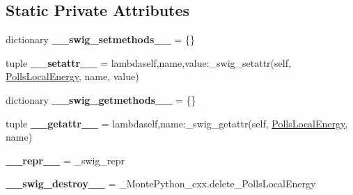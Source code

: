 \subsection*{Static Private Attributes}
\begin{DoxyCompactItemize}
\item 
\hypertarget{classMontePython__cxx_1_1PollsLocalEnergy_ad224e8255fddf42fbfcaa88f7781741c}{}dictionary {\bfseries \+\_\+\+\_\+swig\+\_\+setmethods\+\_\+\+\_\+} = \{\}\label{classMontePython__cxx_1_1PollsLocalEnergy_ad224e8255fddf42fbfcaa88f7781741c}

\item 
\hypertarget{classMontePython__cxx_1_1PollsLocalEnergy_a3f9241f26fbfdff1620254a6572a4f10}{}tuple {\bfseries \+\_\+\+\_\+setattr\+\_\+\+\_\+} = lambdaself,name,value\+:\+\_\+swig\+\_\+setattr(self, \hyperlink{classMontePython__cxx_1_1PollsLocalEnergy}{Polls\+Local\+Energy}, name, value)\label{classMontePython__cxx_1_1PollsLocalEnergy_a3f9241f26fbfdff1620254a6572a4f10}

\item 
\hypertarget{classMontePython__cxx_1_1PollsLocalEnergy_abe2eba41bcdb758f049ab7d093256c81}{}dictionary {\bfseries \+\_\+\+\_\+swig\+\_\+getmethods\+\_\+\+\_\+} = \{\}\label{classMontePython__cxx_1_1PollsLocalEnergy_abe2eba41bcdb758f049ab7d093256c81}

\item 
\hypertarget{classMontePython__cxx_1_1PollsLocalEnergy_afc0ced50c22052b2610fdbce989936a3}{}tuple {\bfseries \+\_\+\+\_\+getattr\+\_\+\+\_\+} = lambdaself,name\+:\+\_\+swig\+\_\+getattr(self, \hyperlink{classMontePython__cxx_1_1PollsLocalEnergy}{Polls\+Local\+Energy}, name)\label{classMontePython__cxx_1_1PollsLocalEnergy_afc0ced50c22052b2610fdbce989936a3}

\item 
\hypertarget{classMontePython__cxx_1_1PollsLocalEnergy_a5b9e46221033f5b82f8c2683a3f0c13f}{}{\bfseries \+\_\+\+\_\+repr\+\_\+\+\_\+} = \+\_\+swig\+\_\+repr\label{classMontePython__cxx_1_1PollsLocalEnergy_a5b9e46221033f5b82f8c2683a3f0c13f}

\item 
\hypertarget{classMontePython__cxx_1_1PollsLocalEnergy_addb6a5cc38e573ad759c0755b099eae1}{}{\bfseries \+\_\+\+\_\+swig\+\_\+destroy\+\_\+\+\_\+} = \+\_\+\+Monte\+Python\+\_\+cxx.\+delete\+\_\+\+Polls\+Local\+Energy\label{classMontePython__cxx_1_1PollsLocalEnergy_addb6a5cc38e573ad759c0755b099eae1}

\end{DoxyCompactItemize}



